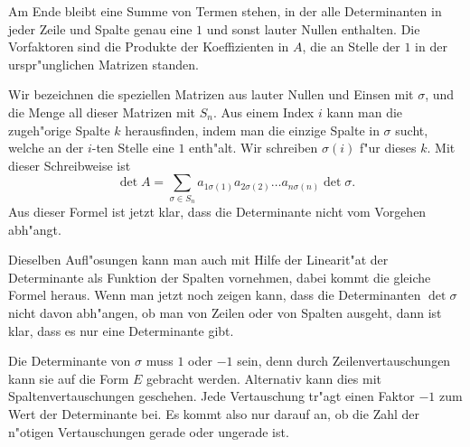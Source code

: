 Am Ende bleibt eine Summe von Termen stehen, in der alle Determinanten
in jeder Zeile und Spalte genau eine $1$ und sonst lauter Nullen
enthalten.
Die Vorfaktoren sind die Produkte der Koeffizienten in $A$,
die an Stelle der $1$ in der urspr"unglichen Matrizen standen.

Wir bezeichnen die speziellen Matrizen aus lauter Nullen und Einsen
mit $\sigma$, und die Menge all dieser Matrizen mit $S_n$.
Aus einem
Index $i$ kann man die zugeh"orige Spalte $k$ herausfinden, indem
man die einzige Spalte in $\sigma$ sucht, welche an der $i$-ten
Stelle eine $1$ enth"alt.
Wir schreiben $\sigma(i)$ f"ur dieses $k$.
Mit dieser Schreibweise ist 
\[
\det A=\sum_{\sigma\in S_n}
a_{1\sigma(1)}
a_{2\sigma(2)}
\dots
a_{n\sigma(n)}
\det \sigma.
\]
Aus dieser Formel ist jetzt klar, dass die Determinante nicht vom
Vorgehen abh"angt.

Dieselben Aufl"osungen kann man auch mit Hilfe der Linearit"at der
Determinante als Funktion der Spalten vornehmen, dabei kommt die 
gleiche Formel heraus.
Wenn man jetzt noch zeigen kann, dass
die Determinanten $\det\sigma$ nicht davon abh"angen, ob man von
Zeilen oder von Spalten ausgeht, dann ist klar, dass es nur eine
Determinante gibt.

Die Determinante von $\sigma$ muss $1$ oder $-1$ sein, denn durch
Zeilenvertauschungen kann sie auf die Form $E$ gebracht werden.
Alternativ kann dies mit Spaltenvertauschungen geschehen.
Jede Vertauschung tr"agt einen Faktor $-1$ zum Wert der Determinante bei.
Es kommt also nur darauf an, ob die Zahl der n"otigen
Vertauschungen gerade oder ungerade ist.
